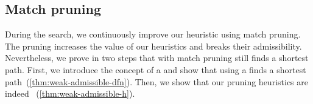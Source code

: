 \subsection{Match pruning} \label{sec:pruning-proof}

During the \A search, we continuously improve our heuristic using match pruning.
The pruning increases the value of our heuristics and breaks their admissibility.
Nevertheless, we prove in two steps that \A with match pruning still finds a
shortest path. First, we introduce the concept of a \emph{\wah} and show that \A
using a \wah finds a shortest path~(\cref{thm:weak-admissible-dfn}). Then, we
show that our pruning heuristics are indeed \wa~(\cref{thm:weak-admissible-h}).



